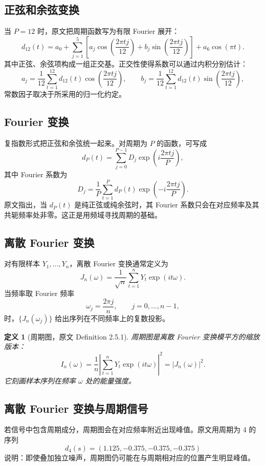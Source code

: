 \documentclass[11pt,a4paper,openany]{ctexbook}
\newtheorem{definition}{定义}[section]
\begin{document}
\subsection{正弦和余弦变换}

当 \(P=12\) 时，原文把周期函数写为有限 Fourier 展开：
\[
  d_{12}(t)
  =a_0+\sum_{j=1}^{5}
  \left[
    a_j\cos\left(\frac{2\pi tj}{12}\right)
    +b_j\sin\left(\frac{2\pi tj}{12}\right)
  \right]
  +a_6\cos(\pi t).
\]
其中正弦、余弦项构成一组正交基。正交性使得系数可以通过内积分别估计：
\[
  a_j=\frac{1}{12}\sum_{t=1}^{12}d_{12}(t)
      \cos\left(\frac{2\pi tj}{12}\right),
  \qquad
  b_j=\frac{1}{12}\sum_{t=1}^{12}d_{12}(t)
      \sin\left(\frac{2\pi tj}{12}\right),
\]
常数因子取决于所采用的归一化约定。

\subsection{Fourier 变换}

复指数形式把正弦和余弦统一起来。对周期为 \(P\) 的函数，可写成
\[
  d_P(t)=\sum_{j=0}^{P-1}D_j\exp\left(i\frac{2\pi tj}{P}\right),
\]
其中 Fourier 系数为
\[
  D_j=\frac{1}{P}\sum_{t=1}^P
  d_P(t)\exp\left(-i\frac{2\pi tj}{P}\right).
\]
原文指出，当 \(d_P(t)\) 是纯正弦或纯余弦时，其 Fourier 系数只会在对应频率及其共轭频率处非零。这正是用频域寻找周期的基础。

\subsection{离散 Fourier 变换}

对有限样本 \(Y_1,\ldots,Y_n\)，离散 Fourier 变换通常定义为
\[
  J_n(\omega)
  =\frac{1}{\sqrt{n}}\sum_{t=1}^n Y_t\exp(it\omega).
\]
当频率取 Fourier 频率
\[
  \omega_j=\frac{2\pi j}{n},\qquad j=0,\ldots,n-1,
\]
时，\(\{J_n(\omega_j)\}\) 给出序列在不同频率上的复数投影。

\begin{definition}[周期图，原文 Definition 2.5.1]
周期图是离散 Fourier 变换模平方的缩放版本：
\[
  I_n(\omega)
  =\frac{1}{n}\left|\sum_{t=1}^nY_t\exp(it\omega)\right|^2
  =|J_n(\omega)|^2.
\]
它刻画样本序列在频率 \(\omega\) 处的能量强度。
\end{definition}

\subsection{离散 Fourier 变换与周期信号}

若信号中包含周期成分，周期图会在对应频率附近出现峰值。原文用周期为 4 的序列
\[
  d_4(s)=(1.125,-0.375,-0.375,-0.375)
\]
说明：即使叠加独立噪声，周期图仍可能在与周期相对应的位置产生明显峰值。
\end{document}
